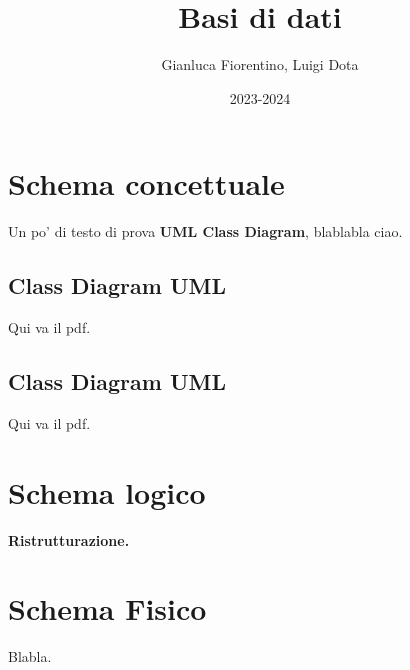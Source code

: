 \documentclass[12pt]{article}
\title{Basi di dati}
\author{Gianluca Fiorentino, Luigi Dota}
\date{2023-2024}
\begin{document}
    
    \tableofcontents
    \newpage
    \section{Schema concettuale}
    Un po' di testo di prova \textbf{UML Class Diagram}, blablabla ciao.
    \subsection{Class Diagram UML}
    Qui va il pdf.
    \subsection{Class Diagram UML}
    Qui va il pdf.
    \newpage
    \section{Schema logico}
    \textbf{Ristrutturazione.}
    \newpage
    \section{Schema Fisico}
    Blabla.
\end{document}
